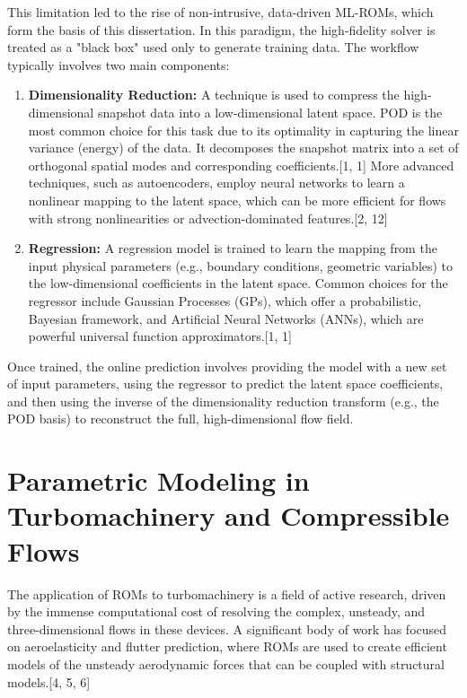 \documentclass[12pt, a4paper]{report}
\begin{document}
This limitation led to the rise of non-intrusive, data-driven ML-ROMs, which form the basis of this dissertation. In this paradigm, the high-fidelity solver is treated as a "black box" used only to generate training data. The workflow typically involves two main components:
\begin{enumerate}
    \item \textbf{Dimensionality Reduction:} A technique is used to compress the high-dimensional snapshot data into a low-dimensional latent space. POD is the most common choice for this task due to its optimality in capturing the linear variance (energy) of the data. It decomposes the snapshot matrix into a set of orthogonal spatial modes and corresponding coefficients.[1, 1] More advanced techniques, such as autoencoders, employ neural networks to learn a nonlinear mapping to the latent space, which can be more efficient for flows with strong nonlinearities or advection-dominated features.[2, 12]
    \item \textbf{Regression:} A regression model is trained to learn the mapping from the input physical parameters (e.g., boundary conditions, geometric variables) to the low-dimensional coefficients in the latent space. Common choices for the regressor include Gaussian Processes (GPs), which offer a probabilistic, Bayesian framework, and Artificial Neural Networks (ANNs), which are powerful universal function approximators.[1, 1]
\end{enumerate}
Once trained, the online prediction involves providing the model with a new set of input parameters, using the regressor to predict the latent space coefficients, and then using the inverse of the dimensionality reduction transform (e.g., the POD basis) to reconstruct the full, high-dimensional flow field.

\section{Parametric Modeling in Turbomachinery and Compressible Flows}

The application of ROMs to turbomachinery is a field of active research, driven by the immense computational cost of resolving the complex, unsteady, and three-dimensional flows in these devices. A significant body of work has focused on aeroelasticity and flutter prediction, where ROMs are used to create efficient models of the unsteady aerodynamic forces that can be coupled with structural models.[4, 5, 6]
\end{document}
